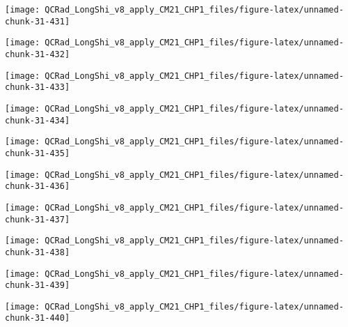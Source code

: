 \documentclass[
  10pt,
  a4paper,oneside]{article}
\begin{document}
\begin{center}\texttt{[image: QCRad\_LongShi\_v8\_apply\_CM21\_CHP1\_files/figure-latex/unnamed-chunk-31-431]} \end{center}

\begin{center}\texttt{[image: QCRad\_LongShi\_v8\_apply\_CM21\_CHP1\_files/figure-latex/unnamed-chunk-31-432]} \end{center}

\begin{center}\texttt{[image: QCRad\_LongShi\_v8\_apply\_CM21\_CHP1\_files/figure-latex/unnamed-chunk-31-433]} \end{center}

\begin{center}\texttt{[image: QCRad\_LongShi\_v8\_apply\_CM21\_CHP1\_files/figure-latex/unnamed-chunk-31-434]} \end{center}

\begin{center}\texttt{[image: QCRad\_LongShi\_v8\_apply\_CM21\_CHP1\_files/figure-latex/unnamed-chunk-31-435]} \end{center}

\begin{center}\texttt{[image: QCRad\_LongShi\_v8\_apply\_CM21\_CHP1\_files/figure-latex/unnamed-chunk-31-436]} \end{center}

\begin{center}\texttt{[image: QCRad\_LongShi\_v8\_apply\_CM21\_CHP1\_files/figure-latex/unnamed-chunk-31-437]} \end{center}

\begin{center}\texttt{[image: QCRad\_LongShi\_v8\_apply\_CM21\_CHP1\_files/figure-latex/unnamed-chunk-31-438]} \end{center}

\begin{center}\texttt{[image: QCRad\_LongShi\_v8\_apply\_CM21\_CHP1\_files/figure-latex/unnamed-chunk-31-439]} \end{center}

\begin{center}\texttt{[image: QCRad\_LongShi\_v8\_apply\_CM21\_CHP1\_files/figure-latex/unnamed-chunk-31-440]} \end{center}
\end{document}
